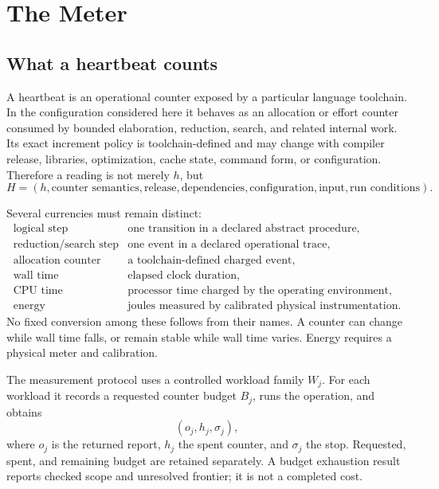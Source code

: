 \chapter{The Meter}

\section{What a heartbeat counts}

A heartbeat is an operational counter exposed by a particular language toolchain.  In the configuration considered
here it behaves as an allocation or effort counter consumed by bounded elaboration, reduction, search, and related
internal work.  Its exact increment policy is toolchain-defined and may change with compiler release, libraries,
optimization, cache state, command form, or configuration.  Therefore a reading is not merely \(h\), but
\[
H=(h,\text{counter semantics},\text{release},\text{dependencies},
\text{configuration},\text{input},\text{run conditions}).
\]

Several currencies must remain distinct:
\[
\begin{array}{ll}
\text{logical step}&\text{one transition in a declared abstract procedure},\\
\text{reduction/search step}&\text{one event in a declared operational trace},\\
\text{allocation counter}&\text{a toolchain-defined charged event},\\
\text{wall time}&\text{elapsed clock duration},\\
\text{CPU time}&\text{processor time charged by the operating environment},\\
\text{energy}&\text{joules measured by calibrated physical instrumentation}.
\end{array}
\]
No fixed conversion among these follows from their names.  A counter can change while wall time falls, or remain
stable while wall time varies.  Energy requires a physical meter and calibration.

The measurement protocol uses a controlled workload family \(W_j\).  For each workload it records a requested counter
budget \(B_j\), runs the operation, and obtains
\[
                         (o_j,h_j,\sigma_j),
\]
where \(o_j\) is the returned report, \(h_j\) the spent counter, and \(\sigma_j\) the stop.  Requested, spent, and
remaining budget are retained separately.  A budget exhaustion result reports checked scope and unresolved frontier;
it is not a completed cost.

